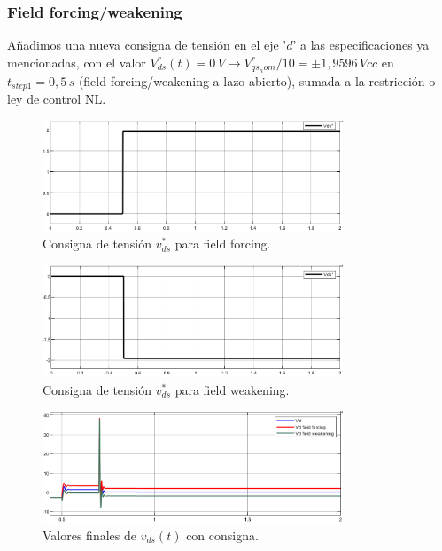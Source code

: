 \documentclass{article}
\begin{document}
\subsubsection{Field forcing/weakening}

Añadimos una nueva consigna de tensión en el eje '$d$' a las especificaciones ya mencionadas, con el 
valor $V^r_{ds}(t) = 0 \, V \rightarrow V^r_{qs_nom}/10 = ±1,9596 \, Vcc$ en $t_{step1} = 0,5 \, s$ 
(field forcing/weakening a lazo abierto), sumada a la restricción o ley de control NL.

\begin{figure}[H]
    \centering
    \includegraphics[width=0.8\textwidth]{5.1.6_d1.png}
    \caption{Consigna de tensión $v^*_{ds}$ para field forcing.}
\end{figure}

\begin{figure}[H]
    \centering
    \includegraphics[width=0.8\textwidth]{5.1.6_d2.png}
    \caption{Consigna de tensión $v^*_{ds}$ para field weakening.}
\end{figure}

\begin{figure}[H]
    \centering
    \includegraphics[width=0.8\textwidth]{5.1.6_d3.png}
    \caption{Valores finales de $v_{ds}(t)$ con consigna.}
\end{figure}
\end{document}
